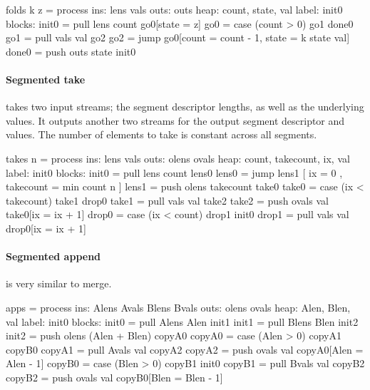\begin{code}
folds k z = process
     ins: lens vals
    outs: outs
    heap: {count, state, val}
   label: init0
  blocks: init0 = pull lens count go0[state = z]
          go0   = case (count > 0) go1 done0
          go1   = pull vals val    go2
          go2   = jump go0[count = count - 1, state = k state val]
          done0 = push outs state init0
\end{code}


\paragraph{Segmented take}
takes two input streams; the segment descriptor lengths, as well as the underlying values.
It outputs another two streams for the output segment descriptor and values.
The number of elements to take is constant across all segments.

\begin{code}
takes n = process
     ins: lens vals
    outs: olens ovals
    heap: {count, takecount, ix, val}
   label: init0
  blocks: init0 = pull lens count lens0
          lens0 = jump lens1
                [ ix = 0
                , takecount = min count n ]
          lens1 = push olens takecount take0
          take0 = case (ix < takecount) take1 drop0
          take1 = pull vals val take2
          take2 = push ovals val take0[ix = ix + 1]
          drop0 = case (ix < count) drop1 init0
          drop1 = pull vals val drop0[ix = ix + 1]
\end{code}

\paragraph{Segmented append} is very similar to merge.

\begin{code}
apps = process
     ins: Alens Avals Blens Bvals
    outs: olens ovals
    heap: {Alen, Blen, val}
   label: init0
  blocks: init0 = pull Alens Alen init1
          init1 = pull Blens Blen init2
          init2 = push olens  (Alen + Blen) copyA0
          copyA0 = case (Alen > 0) copyA1 copyB0
          copyA1 = pull Avals val copyA2
          copyA2 = push ovals val copyA0[Alen = Alen - 1]
          copyB0 = case (Blen > 0) copyB1 init0
          copyB1 = pull Bvals val copyB2
          copyB2 = push ovals val copyB0[Blen = Blen - 1]
\end{code}

